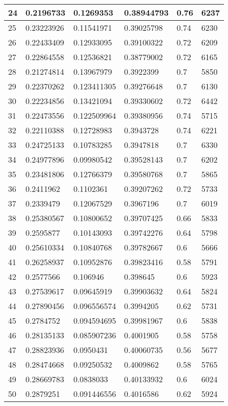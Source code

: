 \begin{longtable}{|l|l|l|l|l|l|}
24 & 0.2196733 & 0.1269353 & 0.38944793 & 0.76 & 6237 \\ \hline 
25 & 0.23223926 & 0.11541971 & 0.39025798 & 0.74 & 6230 \\ \hline 
26 & 0.22433409 & 0.12933095 & 0.39100322 & 0.72 & 6209 \\ \hline 
27 & 0.22864558 & 0.12536821 & 0.38779002 & 0.72 & 6165 \\ \hline 
28 & 0.21274814 & 0.13967979 & 0.3922399 & 0.7 & 5850 \\ \hline 
29 & 0.22370262 & 0.123411305 & 0.39276648 & 0.7 & 6130 \\ \hline 
30 & 0.22234856 & 0.13421094 & 0.39330602 & 0.72 & 6442 \\ \hline 
31 & 0.22473556 & 0.122509964 & 0.39380956 & 0.74 & 5715 \\ \hline 
32 & 0.22110388 & 0.12728983 & 0.3943728 & 0.74 & 6221 \\ \hline 
33 & 0.24725133 & 0.10783285 & 0.3947818 & 0.7 & 6330 \\ \hline 
34 & 0.24977896 & 0.09980542 & 0.39528143 & 0.7 & 6202 \\ \hline 
35 & 0.23481806 & 0.12766379 & 0.39580768 & 0.7 & 5865 \\ \hline 
36 & 0.2411962 & 0.1102361 & 0.39207262 & 0.72 & 5733 \\ \hline 
37 & 0.2339479 & 0.12067529 & 0.3967196 & 0.7 & 6019 \\ \hline 
38 & 0.25380567 & 0.10800652 & 0.39707425 & 0.66 & 5833 \\ \hline 
39 & 0.2595877 & 0.10143093 & 0.39742276 & 0.64 & 5798 \\ \hline 
40 & 0.25610334 & 0.10840768 & 0.39782667 & 0.6 & 5666 \\ \hline 
41 & 0.26258937 & 0.10952876 & 0.39823416 & 0.58 & 5791 \\ \hline 
42 & 0.2577566 & 0.106946 & 0.398645 & 0.6 & 5923 \\ \hline 
43 & 0.27539617 & 0.09645919 & 0.39903632 & 0.64 & 5824 \\ \hline 
44 & 0.27890456 & 0.096556574 & 0.3994205 & 0.62 & 5731 \\ \hline 
45 & 0.2784752 & 0.094594695 & 0.39981967 & 0.6 & 5838 \\ \hline 
46 & 0.28135133 & 0.085907236 & 0.4001905 & 0.58 & 5758 \\ \hline 
47 & 0.28823936 & 0.0950431 & 0.40060735 & 0.56 & 5677 \\ \hline 
48 & 0.28474668 & 0.09250532 & 0.4009862 & 0.58 & 5765 \\ \hline 
49 & 0.28669783 & 0.0838033 & 0.40133932 & 0.6 & 6024 \\ \hline 
50 & 0.2879251 & 0.091446556 & 0.4016586 & 0.62 & 5924 \\ \hline 
\end{longtable}